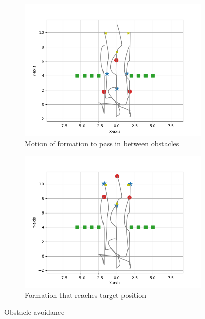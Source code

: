 \documentclass[a4paper,11pt,oneside]{book}
\begin{document}
\begin{figure}[h]
\centering
	\begin{subfigure}{0.49\textwidth}	
	\includegraphics[scale=0.43]{Hexagon_obstacle}
	\caption{Motion of formation to pass in between obstacles}
	\end{subfigure}
\hfill
	\begin{subfigure}{0.49\textwidth}	
	\includegraphics[scale=0.43]{Hexagon_obstacle_target}
	\caption{Formation that reaches target position}
	\end{subfigure}
\caption{Obstacle avoidance}
\label{obstacle}
\end{figure}
\end{document}
